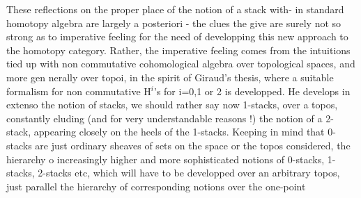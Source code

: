 These reflections on the proper place of the notion of a stack with-%
in standard homotopy algebra  are largely a posteriori  -  the clues the
give are surely not so strong as to   imperative feeling for the need
of developping this new approach to the homotopy category.  Rather,  the
imperative feeling comes from the  intuitions tied up with non
commutative  cohomological algebra over topological spaces,  and more gen%
\hand{-}nerally over topoi, in the spirit of Giraud's thesis,  where a suitable
formalism for non commutative H$^{i}$'s for  i=0,1 or 2 is developped.  He
develops in extenso the notion of stacks,  we should rather say now
1-stacks,  over a topos,  constantly eluding (and for very understandable
reasons !) the notion of a  2-stack,  appearing closely on the heels
of the 1-stacks.  Keeping in mind that 0-stacks are just ordinary
sheaves of sets\hand{,}  on the space or the topos considered,  the hierarchy o
increasingly higher and more sophisticated notions of 0-stacks, 1-stacks,
2-stacks etc,  which will have to be developped over an arbitrary topos,
just parallel the hierarchy of corresponding notions over the one-point
